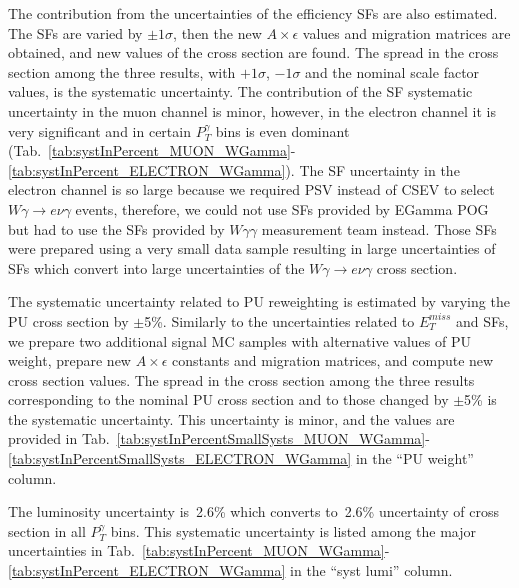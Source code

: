 
The contribution from the uncertainties of the efficiency SFs are also estimated. The SFs are varied by $\pm 1\sigma$, then the new $A \times \epsilon$ values and migration matrices are obtained, and new values of the cross section are found. The spread in the cross section among the three results, with $+1\sigma$, $-1\sigma$ and the nominal scale factor values, is the systematic uncertainty. The contribution of the SF systematic uncertainty in the muon channel is minor, however, in the electron channel it is very significant and in certain $P_T^{\gamma}$ bins is even dominant (Tab.~\ref{tab:systInPercent_MUON_WGamma}-\ref{tab:systInPercent_ELECTRON_WGamma}). The SF uncertainty in the electron channel is so large because we required PSV instead of CSEV to select $W\gamma\rightarrow e\nu\gamma$ events, therefore, we could not use SFs provided by EGamma POG but had to use the SFs provided by $W\gamma\gamma$ measurement team instead. Those SFs were prepared using a very small data sample resulting in large uncertainties of SFs which convert into large uncertainties of the $W\gamma\rightarrow e\nu\gamma$ cross section. 



The systematic uncertainty related to PU reweighting is estimated by varying the PU cross section by $\pm$5\%. Similarly to the uncertainties related to $E_T^{miss}$ and SFs, we prepare two additional signal MC samples with alternative values of PU weight, prepare new $A \times \epsilon$ constants and migration matrices, and compute new cross section values. The spread in the cross section among the three results corresponding to the nominal PU cross section and to those changed by $\pm$5\% is the systematic uncertainty. This uncertainty is minor, and the values are provided in Tab.~\ref{tab:systInPercentSmallSysts_MUON_WGamma}-\ref{tab:systInPercentSmallSysts_ELECTRON_WGamma} in the ``PU weight'' column.

The luminosity uncertainty is~2.6\% which converts to~2.6\% uncertainty of cross section in all $P_T^{\gamma}$ bins. This systematic uncertainty is listed among the major uncertainties in Tab.~\ref{tab:systInPercent_MUON_WGamma}-\ref{tab:systInPercent_ELECTRON_WGamma} in the ``syst lumi'' column.

